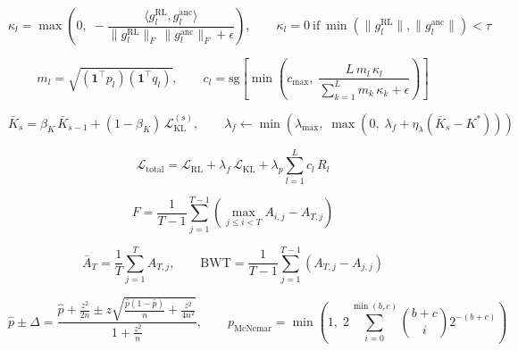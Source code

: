 \begin{equation}
  \kappa_l = \max\left(0,\; -\frac{\langle g_l^{\mathrm{RL}}, g_l^{\mathrm{anc}}\rangle}{\|g_l^{\mathrm{RL}}\|_F\,\|g_l^{\mathrm{anc}}\|_F + \epsilon}\right),\qquad \kappa_l = 0\ \mathrm{if}\ \min\left(\|g_l^{\mathrm{RL}}\|, \|g_l^{\mathrm{anc}}\|\right) < \tau
  \label{eq:eq_conflict}
\end{equation}

\begin{equation}
  m_l = \sqrt{\left(\mathbf{1}^{\top}p_l\right)\left(\mathbf{1}^{\top}q_l\right)},\qquad c_l = \mathrm{sg}\left[\min\left(c_{\max},\; \frac{L\,m_l\,\kappa_l}{\sum_{k=1}^{L} m_k\,\kappa_k + \epsilon}\right)\right]
  \label{eq:eq_coef}
\end{equation}

\begin{equation}
  \bar{K}_s = \beta_K\,\bar{K}_{s-1} + (1-\beta_K)\,\mathcal{L}_{\mathrm{KL}}^{(s)},\qquad \lambda_f \leftarrow \min\left(\lambda_{\max},\; \max\left(0,\; \lambda_f + \eta_\lambda\left(\bar{K}_s - K^{*}\right)\right)\right)
  \label{eq:eq_dual}
\end{equation}

\begin{equation}
  \mathcal{L}_{\mathrm{total}} = \mathcal{L}_{\mathrm{RL}} + \lambda_f\,\mathcal{L}_{\mathrm{KL}} + \lambda_p\sum_{l=1}^{L} c_l\,R_l
  \label{eq:eq_total}
\end{equation}

\begin{equation}
  F = \frac{1}{T-1}\sum_{j=1}^{T-1}\left(\max_{j \leq i < T} A_{i,j} - A_{T,j}\right)
  \label{eq:eq_forgetting}
\end{equation}

\begin{equation}
  \bar{A}_T = \frac{1}{T}\sum_{j=1}^{T} A_{T,j},\qquad \mathrm{BWT} = \frac{1}{T-1}\sum_{j=1}^{T-1}\left(A_{T,j} - A_{j,j}\right)
  \label{eq:eq_final_avg}
\end{equation}

\begin{equation}
  \hat{p} \pm \Delta = \frac{\hat{p} + \frac{z^2}{2n} \pm z\sqrt{\frac{\hat{p}(1-\hat{p})}{n} + \frac{z^2}{4n^2}}}{1 + \frac{z^2}{n}},\qquad p_{\mathrm{McNemar}} = \min\left(1,\; 2\sum_{i=0}^{\min(b,c)} \binom{b+c}{i} 2^{-(b+c)}\right)
  \label{eq:eq_wilson}
\end{equation}

